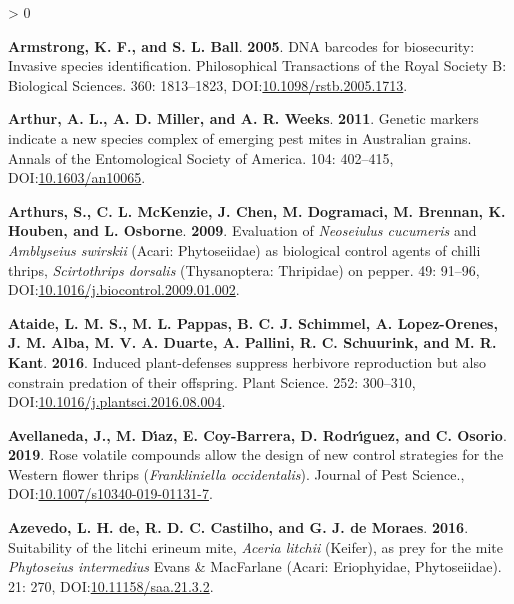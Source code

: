 \documentclass{ufdissertation}[overrideChapters] %
\newlength{\cslhangindent}
\newenvironment{CSLReferences}[2] %
 {%
  \setlength{\parindent}{0pt}
  \ifodd #1 \everypar{\setlength{\hangindent}{\cslhangindent}}\ignorespaces\fi
  \ifnum #2 > 0
  \setlength{\parskip}{#2\baselineskip}
  \fi
 }%
 {}
\begin{document}
{\begin{CSLReferences}{1}{1}
\leavevmode{}%
\textbf{Armstrong, K. F., and S. L. Ball}. \textbf{2005}. {DNA} barcodes for biosecurity: Invasive species identification. Philosophical Transactions of the Royal Society B: Biological Sciences. 360: 1813--1823, DOI:\href{https://doi.org/10.1098/rstb.2005.1713}{10.1098/rstb.2005.1713}.

\leavevmode{}%
\textbf{Arthur, A. L., A. D. Miller, and A. R. Weeks}. \textbf{2011}. Genetic markers indicate a new species complex of emerging pest mites in {Australian} grains. Annals of the Entomological Society of America. 104: 402--415, DOI:\href{https://doi.org/10.1603/an10065}{10.1603/an10065}.

\leavevmode{}%
\textbf{Arthurs, S., C. L. McKenzie, J. Chen, M. Dogramaci, M. Brennan, K. Houben, and L. Osborne}. \textbf{2009}. Evaluation of {\emph{Neoseiulus cucumeris}} and {\emph{Amblyseius swirskii}} ({Acari}: {Phytoseiidae}) as biological control agents of chilli thrips, {\emph{Scirtothrips dorsalis}} ({Thysanoptera}: {Thripidae}) on pepper. 49: 91--96, DOI:\href{https://doi.org/10.1016/j.biocontrol.2009.01.002}{10.1016/j.biocontrol.2009.01.002}.

\leavevmode{}%
\textbf{Ataide, L. M. S., M. L. Pappas, B. C. J. Schimmel, A. Lopez-Orenes, J. M. Alba, M. V. A. Duarte, A. Pallini, R. C. Schuurink, and M. R. Kant}. \textbf{2016}. Induced plant-defenses suppress herbivore reproduction but also constrain predation of their offspring. Plant Science. 252: 300--310, DOI:\href{https://doi.org/10.1016/j.plantsci.2016.08.004}{10.1016/j.plantsci.2016.08.004}.

\leavevmode{}%
\textbf{Avellaneda, J., M. Dı́az, E. Coy-Barrera, D. Rodrı́guez, and C. Osorio}. \textbf{2019}. Rose volatile compounds allow the design of new control strategies for the {Western flower thrips} ({\emph{Frankliniella occidentalis}}). Journal of Pest Science., DOI:\href{https://doi.org/10.1007/s10340-019-01131-7}{10.1007/s10340-019-01131-7}.

\leavevmode{}%
\textbf{Azevedo, L. H. de, R. D. C. Castilho, and G. J. de Moraes}. \textbf{2016}. Suitability of the litchi erineum mite, {\emph{Aceria litchii}} ({Keifer}), as prey for the mite {\emph{Phytoseius intermedius}} {Evans} \& {MacFarlane} ({Acari}: {Eriophyidae}, {Phytoseiidae}). 21: 270, DOI:\href{https://doi.org/10.11158/saa.21.3.2}{10.11158/saa.21.3.2}.


\end{CSLReferences}}
\end{document}
